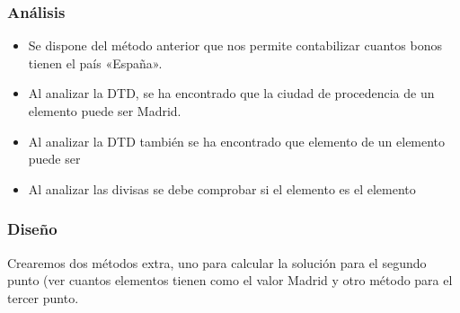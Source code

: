 \documentclass[letterpaper,10pt,spanish]{sphinxmanual}
\begin{document}
\subsubsection{Análisis}
\label{\detokenize{tema6:analisis}}\begin{itemize}
\item {} 
Se dispone del método anterior  que nos permite contabilizar cuantos bonos tienen el país «España».

\item {} 
Al analizar la DTD, se ha encontrado que la ciudad de procedencia de un elemento  puede ser Madrid.

\item {} 
Al analizar la DTD también se ha encontrado que elemento  de un elemento  puede ser 

\item {} 
Al analizar las divisas se debe comprobar si el elemento  es el elemento 

\end{itemize}


\subsubsection{Diseño}
\label{\detokenize{tema6:diseno}}
Crearemos dos métodos extra, uno para calcular la solución para el segundo punto (ver cuantos elementos  tienen como  el valor Madrid y otro método para el tercer punto.
\end{document}

